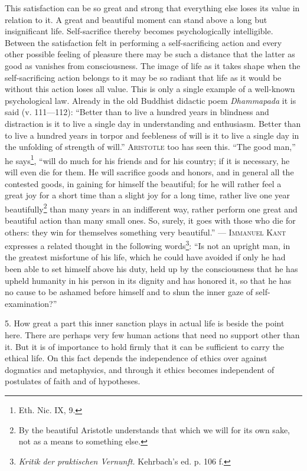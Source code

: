 \documentclass[12pt,a4paper,openany]{book}
\newcommand{\opage}[1]{\marginnote{\footnotesize\textit{[#1]}}}
\begin{document}
This satisfaction can be so great and strong that everything else loses its value in relation to it. A
great and beautiful
\opage{98}moment can stand above a long but insignificant life. Self-sacrifice thereby becomes psychologically
intelligible. Between the satisfaction felt in performing a self-sacrificing action and every other
possible feeling of pleasure there may be such a distance that the latter as good as vanishes from
consciousness. The image of life as it takes shape when the self-sacrificing action belongs to it may be
so radiant that life as it would be without this action loses all value. This is only a single example of
a well-known psychological law. Already in the old Buddhist didactic poem \textit{Dhammapada} it is said
(v. 111---112): ``Better than to live a hundred years in blindness and distraction is it to live a single
day in understanding and enthusiasm. Better than to live a hundred years in torpor and feebleness of will
is it to live a single day in the unfolding of strength of will.'' \textsc{Aristotle} too has seen this.
``The good man,'' he says\footnote[1]{Eth. Nic. IX, 9.}, ``will do much for his friends and for his
country; if it is necessary, he will even die for them. He will sacrifice goods and honors, and in general
all the contested goods, in gaining for himself the beautiful; for he will rather feel a great joy for a
short time than a slight joy for a long time, rather live one year beautifully\footnote[2]{By the beautiful
Aristotle understands that which we will for its own sake, not as a means to something else.} than many
years in an indifferent way, rather perform one great and beautiful action than many small ones. So,
surely, it goes with those who die for others: they win for themselves something very beautiful.'' ---
\textsc{Immanuel Kant} expresses a related thought in the following words\footnote[3]{\textit{Kritik der
praktischen Vernunft.} Kehrbach's ed. p. 106 f.}: ``Is not an upright man, in the greatest misfortune of
his life, which he could have avoided if only he had been able to set himself above his duty, held up by
the consciousness that he has upheld humanity in his person in its dignity and has honored it, so that he
has no cause to be ashamed before himself and to shun the inner gaze of self-examination?''

5. How great a part this inner sanction plays in
\opage{99}actual life is beside the point here. There are perhaps very few human actions that need no support
other than it. But it is of importance to hold firmly that it can be sufficient to carry the ethical
life. On this fact depends the independence of ethics over against dogmatics and metaphysics, and through
it ethics becomes independent of postulates of faith and of hypotheses.
\end{document}
